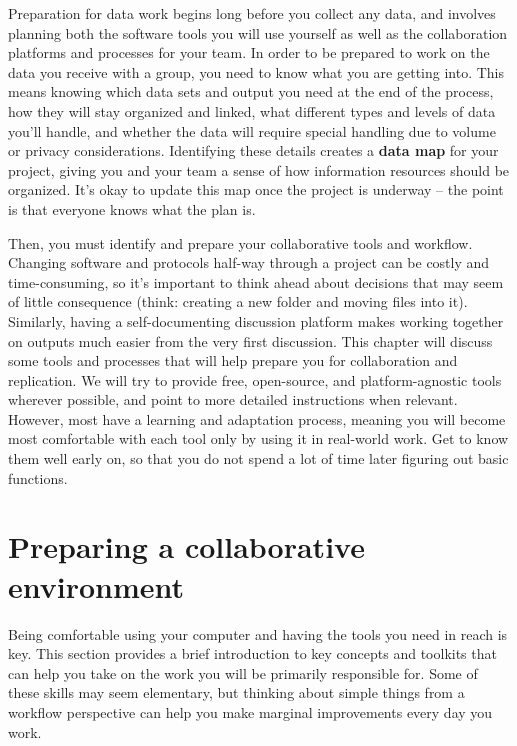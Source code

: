 
\begin{fullwidth}
Preparation for data work begins long before you collect any data,
and involves planning both the software tools you will use yourself
as well as the collaboration platforms and processes for your team.
In order to be prepared to work on the data you receive with a group,
you need to know what you are getting into.
This means knowing which data sets and output you need at the end of the process,
how they will stay organized and linked,
what different types and levels of data you'll handle,
and whether the data will require special handling due to volume or privacy considerations.
Identifying these details creates a \textbf{data map} for your project,
giving you and your team a sense of how information resources should be organized.
It's okay to update this map once the project is underway --
the point is that everyone knows what the plan is.

Then, you must identify and prepare your collaborative tools and workflow.
Changing software and protocols half-way through a project can be costly and time-consuming,
so it's important to think ahead about decisions that may seem of little consequence
(think: creating a new folder and moving files into it).
Similarly, having a self-documenting discussion platform
makes working together on outputs much easier from the very first discussion.
This chapter will discuss some tools and processes that
will help prepare you for collaboration and replication.
We will try to provide free, open-source, and platform-agnostic tools wherever possible,
and point to more detailed instructions when relevant.
However, most have a learning and adaptation process,
meaning you will become most comfortable with each tool
only by using it in real-world work.
Get to know them well early on,
so that you do not spend a lot of time later figuring out basic functions.
\end{fullwidth}



\section{Preparing a collaborative environment}

Being comfortable using your computer and having the tools you need in reach is key.
This section provides a brief introduction to key concepts and toolkits
that can help you take on the work you will be primarily responsible for.
Some of these skills may seem elementary,
but thinking about simple things from a workflow perspective
can help you make marginal improvements every day you work.

